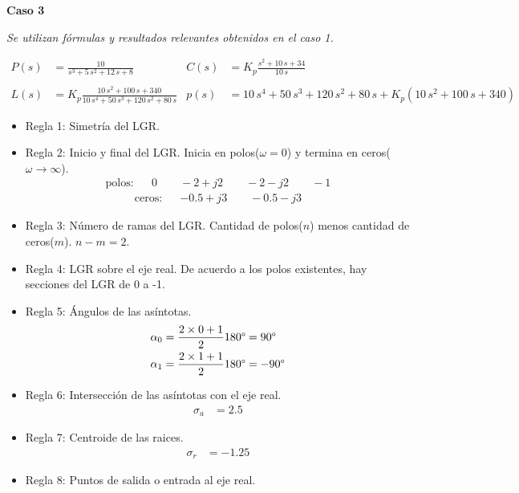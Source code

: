 \textbf{Caso 3}

\textit{Se utilizan fórmulas y resultados relevantes obtenidos en el caso 1.}

\begin{align*}
  P(s) &= 
  \frac{10}{s^3+5\,s^2+12\,s+8}
  &
  C(s) &= K_p
  \frac{s^2+10\,s+34}{10\,s}
  \\\\
  L(s) &= K_p
  \frac{10\,s^2+100\,s+340}{10\,s^4+50\,s^3+120\,s^2+80\,s}
  &
  p(s) &= 
  10\,s^4+50\,s^3+120\,s^2+80\,s + K_p(10\,s^2+100\,s+340)
\end{align*}
\begin{itemize}
  \item Regla 1: Simetría del LGR.
  \item Regla 2: Inicio y final del LGR. Inicia en polos($\omega = 0$) y termina en ceros($\omega \rightarrow \infty$).
  \begin{align*}
    \text{polos:} && 0 \qquad  -2 + j2 \qquad  -2 - j2 \qquad  -1
  \end{align*}
  \begin{align*}
    \text{ceros:} && -0.5 + j3 \qquad -0.5 - j3
  \end{align*}

  \item Regla 3: Número de ramas del LGR. Cantidad de polos($n$) menos cantidad de ceros($m$). $n-m = 2$.
  \item Regla 4: LGR sobre el eje real. 
  De acuerdo a los polos existentes, hay secciones del LGR de 0 a -1.
  \item Regla 5: Ángulos de las asíntotas.
  \begin{align*}
    \alpha_0 &= \frac{2\times0 + 1}{2}  180\degree  = 90\degree
    \\
    \alpha_1 &= \frac{2\times1 + 1}{2}  180\degree = -90\degree
  \end{align*}
  \item Regla 6: Intersección de las asíntotas con el eje real.
  \begin{align*}
    \sigma_a &= 2.5
  \end{align*}
  \item Regla 7: Centroide de las raices.
  \begin{align*}
    \sigma_r &= -1.25
  \end{align*}
  \item Regla 8: Puntos de salida o entrada al eje real.


\end{itemize}
